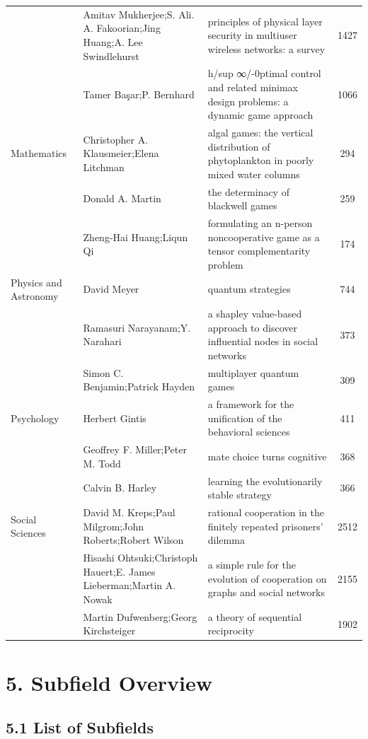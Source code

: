 \documentclass[
  12pt,
]{article}
\begin{document}
\begin{longtable}[t]{>{\raggedright\arraybackslash}p{4cm}>{\raggedright\arraybackslash}p{4cm}>{\raggedright\arraybackslash}p{4cm}c}
 & Amitav Mukherjee;S. Ali. A. Fakoorian;Jing Huang;A. Lee Swindlehurst & principles of physical layer security in multiuser wireless networks: a survey & 1427\\
 & Tamer Başar;P. Bernhard & h/sup ∞/-0ptimal control and related minimax design problems: a dynamic game approach & 1066\\
Mathematics & Christopher A. Klausmeier;Elena Litchman & algal games: the vertical distribution of phytoplankton in poorly mixed water columns & 294\\
 & Donald A. Martin & the determinacy of blackwell games & 259\\
 & Zheng‐Hai Huang;Liqun Qi & formulating an n-person noncooperative game as a tensor complementarity problem & 174\\
Physics and Astronomy & David Meyer & quantum strategies & 744\\
 & Ramasuri Narayanam;Y. Narahari & a shapley value-based approach to discover influential nodes in social networks & 373\\
 & Simon C. Benjamin;Patrick Hayden & multiplayer quantum games & 309\\
Psychology & Herbert Gintis & a framework for the unification of the behavioral sciences & 411\\
 & Geoffrey F. Miller;Peter M. Todd & mate choice turns cognitive & 368\\
 & Calvin B. Harley & learning the evolutionarily stable strategy & 366\\
Social Sciences & David M. Kreps;Paul Milgrom;John Roberts;Robert Wilson & rational cooperation in the finitely repeated prisoners' dilemma & 2512\\
 & Hisashi Ohtsuki;Christoph Hauert;E. James Lieberman;Martin A. Nowak & a simple rule for the evolution of cooperation on graphs and social networks & 2155\\
 & Martin Dufwenberg;Georg Kirchsteiger & a theory of sequential reciprocity & 1902\\
\bottomrule
\end{longtable}
\endgroup{}

\newpage

\section{5. Subfield Overview}\label{subfield-overview}

\subsection{5.1 List of Subfields}\label{list-of-subfields}
\end{document}
